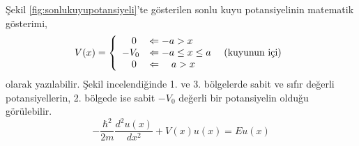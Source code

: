 \documentclass[a4paper,12pt, twoside]{article}
\begin{document}
Şekil 	\ref{fig:sonlukuyupotansiyeli}'te gösterilen sonlu kuyu potansiyelinin matematik gösterimi,
\begin{align}
V ( x )  = \left\{ 
\begin{array} { l l } 
{ \quad 0 } & {\Leftarrow -a > x } \\
{-V _ { 0 } } & {\Leftarrow -a \leq x \leq a } \quad \text{ (kuyunun içi)} \\
{ \quad 0 } & {\Leftarrow \quad a > x }
\end{array} \right. 
\end{align}
olarak yazılabilir. Şekil incelendiğinde 1. ve 3. bölgelerde sabit ve sıfır değerli potansiyellerin, 2. bölgede ise sabit $-V_0$ değerli bir potansiyelin olduğu görülebilir.
\begin{equation}
- \frac { \hbar ^ { 2 } } { 2 m } \frac { d ^ { 2 } u ( x ) } { d x ^ { 2 } } + V ( x ) u ( x ) = E u ( x )
\end{equation}
\end{document}
